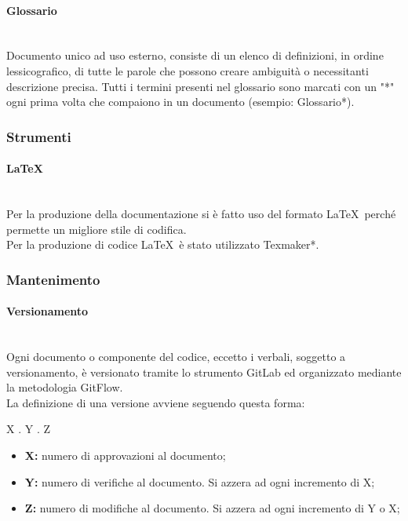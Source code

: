 \documentclass[11pt,a4paper]{article}
\begin{document}
	\paragraph{Glossario}
\noindent \\ Documento unico ad uso esterno, consiste di un elenco di definizioni, in ordine lessicografico, di tutte le parole che possono creare ambiguità o necessitanti descrizione precisa. Tutti i termini presenti nel glossario sono marcati con un "*" ogni prima volta che compaiono in un documento (esempio: Glossario*).

	\subsubsection{Strumenti}
	
	\paragraph{\LaTeX}
	\noindent \\ Per la produzione della documentazione si è fatto uso del formato \LaTeX\ perché permette un migliore stile di codifica.\\
	Per la produzione di codice \LaTeX\ è stato utilizzato Texmaker*.
	
	\subsubsection{Mantenimento}
	
	\paragraph{Versionamento}
\noindent \\ Ogni documento o componente del codice, eccetto i verbali, soggetto a versionamento, è versionato tramite lo strumento GitLab ed organizzato mediante la metodologia GitFlow.\\
La definizione di una versione avviene seguendo questa forma:
\begin{center}
	X . Y . Z
\end{center}

\begin{itemize}
	\item \textbf{X:} numero di approvazioni al documento;
	\item \textbf{Y:} numero di verifiche al documento. Si azzera ad ogni incremento di X;
	\item \textbf{Z:} numero di modifiche al documento. Si azzera ad ogni incremento di Y o X;
\end{itemize}
\end{document}
